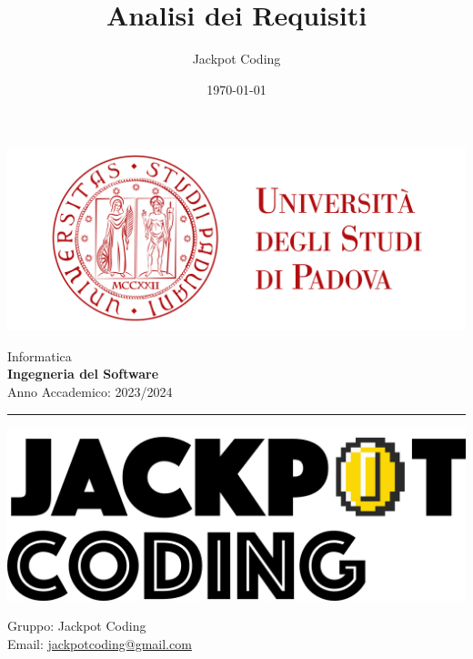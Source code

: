 \documentclass[5pt]{article}
\title{Analisi dei Requisiti}
\author{Jackpot Coding}
\date{\today}
\begin{document}
	
	
	
	\vspace{8pt}
	\includegraphics[scale=0.2]{UNIPDFull.png}
	
	\vspace{30pt}
	
	\begin{minipage}[t]{0.48\textwidth}
		\begin{flushleft}
			Informatica\\
			\vspace{5pt}
			\textbf{\LARGE Ingegneria del Software}\\
			Anno Accademico: 2023/2024
		\end{flushleft}
	\end{minipage}
	
	
	\vspace{5px}
	
	
	\rule{\textwidth}{5pt}
	
	\begin{minipage}[t]{0.50\textwidth}
		\begin{flushleft}
			\hspace{10pt}
			\includegraphics[scale=0.65]{jackpot-logo.png} 
		\end{flushleft}
	\end{minipage}
	\hspace{-60pt} %
	\begin{flushright}
		\begin{minipage}[t]{0.50\textwidth}
			\begin{flushright}
				Gruppo: {\Large Jackpot Coding}\\
				Email: \href{mailto:jackpotcoding@gmail.com}{jackpotcoding@gmail.com}
			\end{flushright}
		\end{minipage}
	\end{flushright}
	
\end{document}
